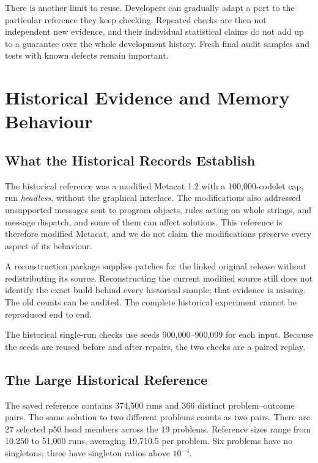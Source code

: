 \documentclass[10pt,letterpaper]{article}
\begin{document}
There is another limit to reuse. Developers can gradually adapt a port to the particular
reference they keep checking. Repeated checks are then not independent new evidence, and
their individual statistical claims do not add up to a guarantee over the whole
development history. Fresh final audit samples and tests with known defects remain
important.

\clearpage

\section{Historical Evidence and Memory Behaviour}\label{app:history}

\subsection{What the Historical Records Establish}\label{sec:protocol}

The historical reference was a modified Metacat 1.2 with a 100,000-codelet cap, run
\emph{headless}, without the graphical interface. The modifications also addressed
unsupported messages sent to program objects, rules acting on whole strings, and message
dispatch, and some of them can affect solutions. This reference is therefore modified
Metacat, and we do not claim the modifications preserve every aspect of its behaviour.

A reconstruction package supplies patches for the linked original release without
redistributing its source. Reconstructing the current modified source still does not
identify the exact build behind every historical sample; that evidence is missing. The old
counts can be audited. The complete historical experiment cannot be reproduced end to end.

The historical single-run checks use seeds 900,000--900,099 for each input. Because the
seeds are reused before and after repairs, the two checks are a paired replay.

\subsection{The Large Historical Reference}\label{sec:reference-results}

The saved reference contains 374,500 runs and 366 distinct problem--outcome pairs. The
same solution to two different problems counts as two pairs. There are 27 selected p50
head members across the 19 problems. Reference sizes range from 10,250 to 51,000 runs,
averaging 19,710.5 per problem. Six problems have no singletons; three have singleton
ratios above \(10^{-4}\).
\end{document}
